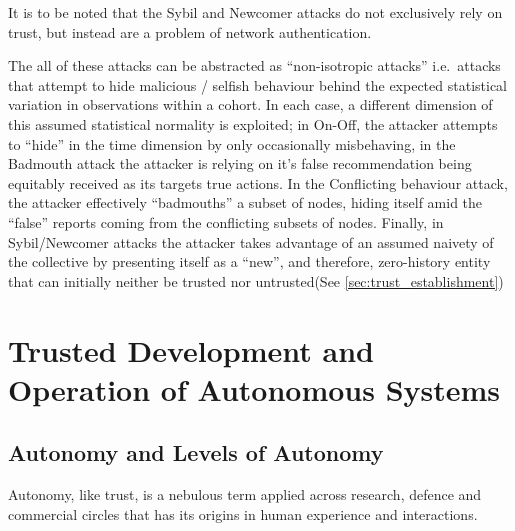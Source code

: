 It is to be noted that the Sybil and Newcomer attacks do not exclusively rely on trust, but instead are a problem of network authentication.

The all of these attacks can be abstracted as ``non-isotropic attacks'' i.e.\ attacks that attempt to hide malicious / selfish behaviour behind the expected statistical variation in observations within a cohort.
In each case, a different dimension of this assumed statistical normality is exploited; in On-Off, the attacker attempts to ``hide'' in the time dimension by only occasionally misbehaving, in the Badmouth attack the attacker is relying on it's false recommendation being equitably received as its targets true actions. 
In the Conflicting behaviour attack, the attacker effectively ``badmouths'' a subset of nodes, hiding itself amid the ``false'' reports coming from the conflicting subsets of nodes. 
Finally, in Sybil/Newcomer attacks the attacker takes advantage of an assumed naivety of the collective by presenting itself as a ``new'', and therefore, zero-history entity that can initially neither be trusted nor untrusted(See \autoref{sec:trust_establishment})


\section{Trusted Development and Operation of Autonomous Systems}\label{sec:trust_autonomy}

\subsection{Autonomy and Levels of Autonomy}

Autonomy, like trust, is a nebulous term applied across research, defence and commercial circles that has its origins in human experience and interactions. 

